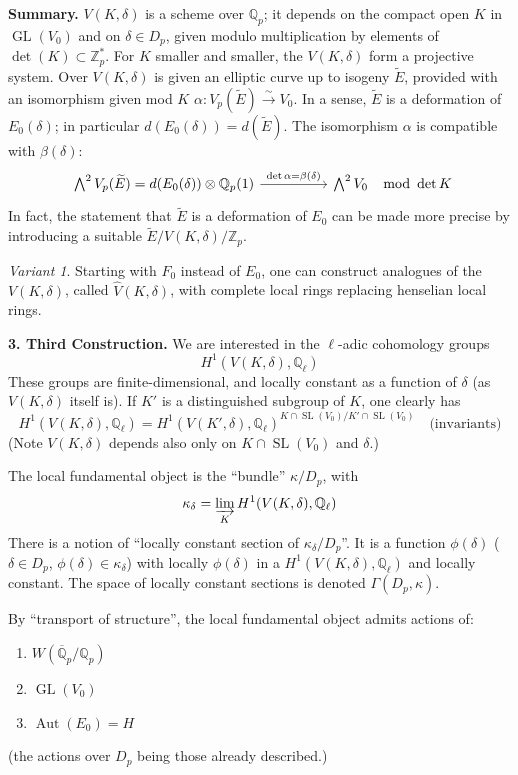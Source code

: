 \documentclass[11pt,a4paper]{article}
\theoremstyle{plain}
\theoremstyle{definition}
\theoremstyle{remark}
\newtheorem*{variant}{Variant}
\DeclareMathOperator{\Aut}{Aut}
\DeclareMathOperator{\GL}{GL}
\DeclareMathOperator{\SL}{SL}
\newcommand{\Z}{\mathbb{Z}}
\newcommand{\Qpbar}{\overline{\mathbb{Q}}_{p}}
\newcommand{\Zp}{\mathbb{Z}_{p}}
\newcommand{\Qp}{\mathbb{Q}_{p}}
\newcommand{\Ql}{\mathbb{Q}_{\ell}}
\newcommand{\Vp}{V_{p}}
\begin{document}
\bigskip

\noindent
\textbf{Summary.} $V(K, \delta)$ is a scheme over $\Qp$; it depends on the compact open $K$ in $\GL(V_{0})$ and on $\delta \in D_{p}$, given modulo multiplication by elements of $\det(K) \subset \Z_{p}^{*}$. For $K$ smaller and smaller, the $V(K, \delta)$ form a projective system. Over $V(K, \delta)$ is given an elliptic curve up to isogeny $\widetilde{E}$, provided with an isomorphism given mod $K$ $\alpha : \Vp(\widetilde{E}) \xrightarrow{\sim} V_{0}$. In a sense, $\widetilde{E}$ is a deformation of $E_{0}(\delta)$; in particular $d(E_{0}(\delta)) = d(\widetilde{E})$. The isomorphism $\alpha$ is compatible with $\beta(\delta)$:
\[
\begin{tikzcd}
\bigwedge^{2} \Vp(\widetilde{E}) = d(E_{0}(\delta)) \otimes \Qp(1) \arrow[rr, "{\det \alpha = \beta(\delta)}"] & & \bigwedge^{2} V_{0}
\end{tikzcd}
\mod \det K
\]
In fact, the statement that $\widetilde{E}$ is a deformation of $E_{0}$ can be made more precise by introducing a suitable $\widetilde{E}/V(K, \delta)/\Zp$.

\begin{variant}
Starting with $F_{0}$ instead of $E_{0}$, one can construct analogues of the $V(K, \delta)$, called $\widehat{V}(K, \delta)$, with complete local rings replacing henselian local rings.
\end{variant}

\medskip

\noindent
\textbf{3. Third Construction.} We are interested in the $\ell$-adic cohomology groups
\[
H^{1}(V(K, \delta), \Ql)
\]
These groups are finite-dimensional, and locally constant as a function of $\delta$ (as $V(K, \delta)$ itself is). If $K'$ is a distinguished subgroup of $K$, one clearly has
\[
H^{1}(V(K, \delta), \Ql) = H^{1}(V(K', \delta), \Ql)^{K \cap \SL(V_{0})/K' \cap \SL(V_{0})} \quad \text{(invariants)}
\]
(Note $V(K, \delta)$ depends also only on $K \cap \SL(V_{0})$ and $\delta$.)

The local fundamental object is the ``bundle'' $\kappa/D_{p}$, with
\[
\kappa_{\delta} = \varinjlim_{K} H^{1}(V(K, \delta), \Ql)
\]
There is a notion of ``locally constant section of $\kappa_{\delta}/D_{p}$''. It is a function $\phi(\delta)$ ($\delta \in D_{p}$, $\phi(\delta) \in \kappa_{\delta}$) with locally $\phi(\delta)$ in a $H^{1}(V(K, \delta), \Ql)$ and locally constant. The space of locally constant sections is denoted $\Gamma(D_{p}, \kappa)$.

By ``transport of structure'', the local fundamental object admits actions of:
\begin{enumerate}[label=(\alph*)]
\item $W(\Qpbar/\Qp)$
\item $\GL(V_{0})$
\item $\Aut(E_{0}) = H$
\end{enumerate}
(the actions over $D_{p}$ being those already described.)
\end{document}
